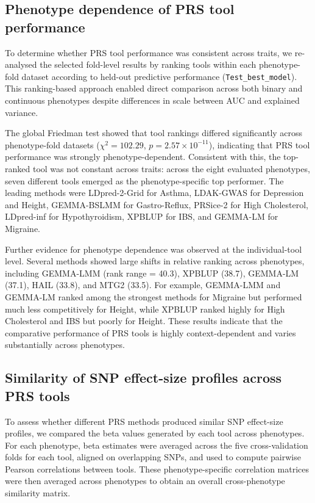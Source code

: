 \documentclass[pdflatex,sn-basic]{sn-jnl}
\begin{document}
\subsection{Phenotype dependence of PRS tool performance}

To determine whether PRS tool performance was consistent across traits, we re-analysed the selected fold-level results by ranking tools within each phenotype-fold dataset according to held-out predictive performance (\texttt{Test\_best\_model}). This ranking-based approach enabled direct comparison across both binary and continuous phenotypes despite differences in scale between AUC and explained variance.

The global Friedman test showed that tool rankings differed significantly across phenotype-fold datasets ($\chi^2 = 102.29$, $p = 2.57 \times 10^{-11}$), indicating that PRS tool performance was strongly phenotype-dependent. Consistent with this, the top-ranked tool was not constant across traits: across the eight evaluated phenotypes, seven different tools emerged as the phenotype-specific top performer. The leading methods were LDpred-2-Grid for Asthma, LDAK-GWAS for Depression and Height, GEMMA-BSLMM for Gastro-Reflux, PRSice-2 for High Cholesterol, LDpred-inf for Hypothyroidism, XPBLUP for IBS, and GEMMA-LM for Migraine.

Further evidence for phenotype dependence was observed at the individual-tool level. Several methods showed large shifts in relative ranking across phenotypes, including GEMMA-LMM (rank range = 40.3), XPBLUP (38.7), GEMMA-LM (37.1), HAIL (33.8), and MTG2 (33.5). For example, GEMMA-LMM and GEMMA-LM ranked among the strongest methods for Migraine but performed much less competitively for Height, while XPBLUP ranked highly for High Cholesterol and IBS but poorly for Height. These results indicate that the comparative performance of PRS tools is highly context-dependent and varies substantially across phenotypes.
\subsection{Similarity of SNP effect-size profiles across PRS tools}

To assess whether different PRS methods produced similar SNP effect-size profiles, we compared the beta values generated by each tool across phenotypes. For each phenotype, beta estimates were averaged across the five cross-validation folds for each tool, aligned on overlapping SNPs, and used to compute pairwise Pearson correlations between tools. These phenotype-specific correlation matrices were then averaged across phenotypes to obtain an overall cross-phenotype similarity matrix.
\end{document}

